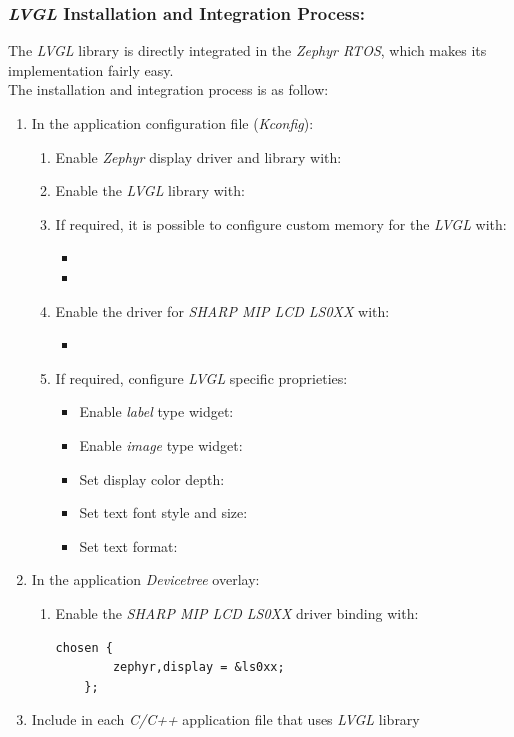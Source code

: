 \documentclass[report.tex]{subfiles}
\begin{document}
\subsubsection{\textit{LVGL} Installation and Integration Process:}
The \textit{LVGL} library is directly integrated in the \textit{Zephyr RTOS}, which makes its implementation fairly easy.\\

The installation and integration process is as follow:
\begin{enumerate}
\item In the application configuration file (\textit{Kconfig}):
\begin{enumerate}
\item Enable \textit{Zephyr} display driver and library with: 
\item Enable the \textit{LVGL} library with: 
\item If required, it is possible to configure custom memory for the \textit{LVGL} with:
\begin{itemize}
\item {}
\item {}
\end{itemize}
\item Enable the driver for \textit{SHARP MIP LCD LS0XX} with:
\begin{itemize}
\item {}
\end{itemize}
\item If required, configure \textit{LVGL} specific proprieties:
\begin{itemize}
\item Enable \textit{label} type widget: 
\item Enable \textit{image} type widget: 
\item Set display color depth: 
\item Set text font style and size: \\ 
\item Set text format: \\
\end{itemize}
\end{enumerate}
\item In the application \textit{Devicetree} overlay:
\begin{enumerate}
\item Enable the \textit{SHARP MIP LCD LS0XX} driver binding with:
\begin{lstlisting}[style=console]
chosen {
		zephyr,display = &ls0xx;
	};
\end{lstlisting}
\end{enumerate}
\item Include  in each \textit{C/C++} application file that uses \textit{LVGL} library
\end{enumerate}
\end{document}
